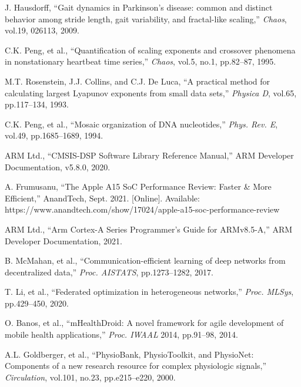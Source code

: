 \documentclass[paper]{ieice}
\begin{document}
\begin{thebibliography}{99}
J. Hausdorff, ``Gait dynamics in Parkinson's disease: common and distinct behavior among stride length, gait variability, and fractal-like scaling,'' \textit{Chaos}, vol.19, 026113, 2009.

C.K. Peng, et al., ``Quantification of scaling exponents and crossover phenomena in nonstationary heartbeat time series,'' \textit{Chaos}, vol.5, no.1, pp.82--87, 1995.

M.T. Rosenstein, J.J. Collins, and C.J. De Luca, ``A practical method for calculating largest Lyapunov exponents from small data sets,'' \textit{Physica D}, vol.65, pp.117--134, 1993.

C.K. Peng, et al., ``Mosaic organization of DNA nucleotides,'' \textit{Phys. Rev. E}, vol.49, pp.1685--1689, 1994.

ARM Ltd., ``CMSIS-DSP Software Library Reference Manual,'' ARM Developer Documentation, v5.8.0, 2020.

A. Frumusanu, ``The Apple A15 SoC Performance Review: Faster & More Efficient,'' AnandTech, Sept. 2021. [Online]. Available: https://www.anandtech.com/show/17024/apple-a15-soc-performance-review

ARM Ltd., ``Arm Cortex-A Series Programmer's Guide for ARMv8.5-A,'' ARM Developer Documentation, 2021.

B. McMahan, et al., ``Communication-efficient learning of deep networks from decentralized data,'' \textit{Proc. AISTATS}, pp.1273--1282, 2017.

T. Li, et al., ``Federated optimization in heterogeneous networks,'' \textit{Proc. MLSys}, pp.429--450, 2020.

O. Banos, et al., ``mHealthDroid: A novel framework for agile development of mobile health applications,'' \textit{Proc. IWAAL} 2014, pp.91--98, 2014.

A.L. Goldberger, et al., ``PhysioBank, PhysioToolkit, and PhysioNet: Components of a new research resource for complex physiologic signals,'' \textit{Circulation}, vol.101, no.23, pp.e215--e220, 2000.

\end{thebibliography}
\end{document}

